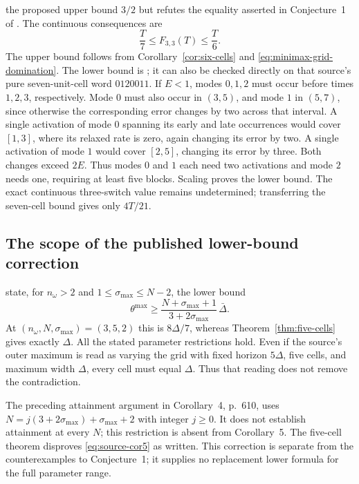 the proposed upper bound $3/2$ but refutes the equality asserted in
Conjecture~1 of \citet[equation~(7.6), p.~615]{sager-zeile2021}.
The continuous consequences are
\begin{equation}\label{eq:three-three-band}
 \frac T7\le F_{3,3}(T)\le\frac T6.
\end{equation}
The upper bound follows from Corollary~\ref{cor:six-cells} and
\eqref{eq:minimax-grid-domination}. The lower bound is
\citet[Proposition~4, p.~612]{sager-zeile2021}; it can also be checked
directly on that source's pure seven-unit-cell word $0120011$.
If $E<1$, modes $0,1,2$ must occur before times $1,2,3$, respectively.
Mode $0$ must also occur in $(3,5)$, and mode $1$ in $(5,7)$, since
otherwise the corresponding error changes by two across that interval.
A single activation of mode $0$ spanning its early and late occurrences
would cover $[1,3]$, where its relaxed rate is zero, again changing
its error by two. A single activation of mode $1$ would cover $[2,5]$,
changing its error by three. Both changes exceed $2E$.
Thus modes $0$ and $1$ each need two activations and mode $2$ needs one,
requiring at least five blocks. Scaling proves the lower bound.
The exact continuous three-switch value remains undetermined;
transferring the seven-cell bound gives only $4T/21$.

\subsection{The scope of the published lower-bound correction}
\citet[Corollary~5, p.~611]{sager-zeile2021} state, for
$n_\omega>2$ and $1\le\sigma_{\max}\le N-2$, the lower bound
\begin{equation}\label{eq:source-cor5}
 \theta^{\max}\ge
 \frac{N+\sigma_{\max}+1}{3+2\sigma_{\max}}\,\bar\Delta.
\end{equation}
At $(n_\omega,N,\sigma_{\max})=(3,5,2)$ this is $8\Delta/7$,
whereas Theorem~\ref{thm:five-cells} gives exactly $\Delta$.
All the stated parameter restrictions hold. Even if the source's outer
maximum is read as varying the grid with fixed horizon $5\Delta$, five
cells, and maximum width $\Delta$, every cell must equal $\Delta$.
Thus that reading does not remove the contradiction.

The preceding attainment argument in Corollary~4, p.~610, uses
$N=j(3+2\sigma_{\max})+\sigma_{\max}+2$ with integer $j\ge0$.
It does not establish attainment at every $N$; this restriction is absent
from Corollary~5. The five-cell theorem disproves
\eqref{eq:source-cor5} as written. This correction is separate from the
counterexamples to Conjecture~1; it supplies no replacement
lower formula for the full parameter range.
